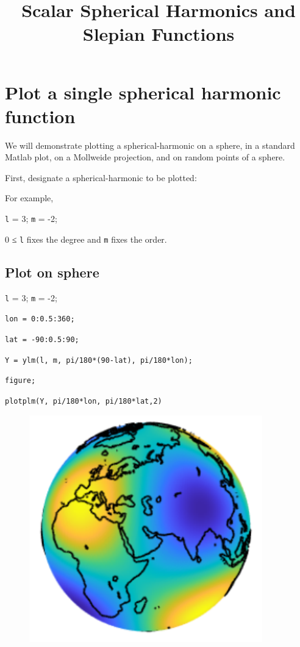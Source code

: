\documentclass{article}
\title{Scalar Spherical Harmonics and Slepian Functions}
\author{}
\date{}
\begin{document}
\maketitle

\tableofcontents 

\section{Plot a single spherical harmonic function}

We will demonstrate plotting a spherical-harmonic on a sphere,  in a standard Matlab plot, on a Mollweide projection, and on random points of a sphere.

First, designate a spherical-harmonic to be plotted:

For example,

\verb+l+ = 3; \verb+m+ = -2;

0 ≤ \verb+l+ fixes the degree and \verb+m+ fixes the order.

\subsection{Plot on sphere}

\setlength{\parskip}{.1mm}

\verb+l+ = 3; \verb+m+ = -2;

\verb+lon = 0:0.5:360;+

\verb+lat = -90:0.5:90;+

\verb+Y = ylm(l, m, pi/180*(90-lat), pi/180*lon);+

\verb+figure;+

\verb+plotplm(Y, pi/180*lon, pi/180*lat,2)+

\begin{figure}[H]
\includegraphics[scale=1]{graph_on_sphere}
\end{figure}
\end{document}
